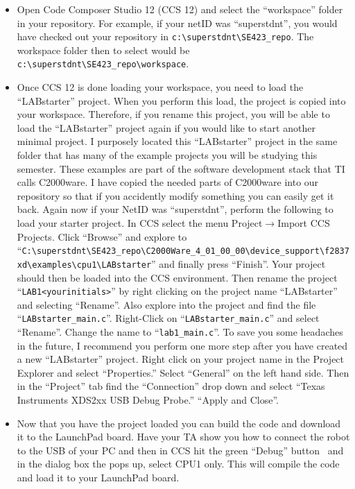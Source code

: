 \documentclass[11pt]{article}
\begin{document}
\Ex
%
\begin{itemize}
    \item Open Code Composer Studio 12 (CCS 12) and select the “workspace” folder in your repository. For example, if your netID was “superstdnt”, you would have checked out your repository in \lstinline|c:\superstdnt\SE423_repo|. The workspace folder then to select would be \lstinline|c:\superstdnt\SE423_repo\workspace|.
    \item Once CCS 12 is done loading your workspace, you need to load the “LABstarter” project. When you perform this load, the project is copied into your workspace. Therefore, if you rename this project, you will be able to load the “LABstarter” project again if you would like to start another minimal project. I purposely located this “LABstarter” project in the same folder that has many of the example projects you will be studying this semester. These examples are part of the software development stack that TI calls C2000ware. I have copied the needed parts of C2000ware into our repository so that if you accidently modify something you can easily get it back. Again now if your NetID was “superstdnt”, perform the following to load your starter project. In CCS select the menu Project$\rightarrow$Import CCS Projects. Click “Browse” and explore to “\lstinline|C:\superstdnt\SE423_repo\C2000Ware_4_01_00_00\device_support\f2837xd\examples\cpu1\LABstarter|” and finally press “Finish”. Your project should then be loaded into the CCS environment. Then rename the project “\lstinline|LAB1<yourinitials>|” by right clicking on the project name “LABstarter” and selecting “Rename”. Also explore into the project and find the file “\lstinline|LABstarter_main.c|”. Right-Click on “\lstinline|LABstarter_main.c|” and select “Rename”. Change the name to “\lstinline|lab1_main.c|”. To save you some headaches in the future, I recommend you perform one more step after you have created a new “LABstarter” project. Right click on your project name in the Project Explorer and select “Properties.” Select “General” on the left hand side. Then in the “Project” tab find the “Connection” drop down and select “Texas Instruments XDS2xx USB Debug Probe.” “Apply and Close”.
    \item Now that you have the project loaded you can build the code and download it to the LaunchPad board. Have your TA show you how to connect the robot to the USB of your PC and then in CCS hit the green “Debug” button \debugBtn\ and in the dialog box the pops up, select CPU1 only. This will compile the code and load it to your LaunchPad board.

\end{itemize}
\end{document}
